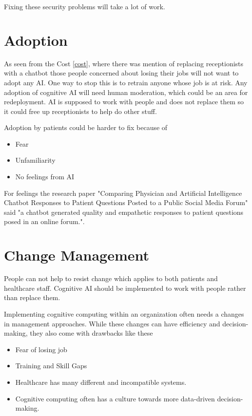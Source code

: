 \documentclass{article}
\begin{document}
Fixing these security problems will take a lot of work.

\section{Adoption}
As seen from the Cost \ref{cost}, where there was mention of replacing receptionists with a chatbot those people concerned about losing their jobs will not want to adopt any AI. One way to stop this is to retrain anyone whose job is at risk. Any adoption of cognitive AI will need human moderation, which could be an area for redeployment. 
AI is supposed to work with people and does not replace them so it could free up receptionists to help do other stuff.

Adoption by patients could be harder to fix because of
\begin{itemize}
	\item Fear
	\item Unfamiliarity
	\item No feelings from AI
\end{itemize}
For feelings the research paper "Comparing Physician and Artificial Intelligence Chatbot Responses to Patient Questions Posted to a Public Social Media Forum" \cite{bedside} said "a chatbot generated quality and empathetic responses to patient questions posed in an online forum.".

\section{Change Management}
People can not help to resist change which applies to both patients and healthcare staff. Cognitive AI should be implemented to work with people rather than replace them.

Implementing cognitive computing within an organization often needs a changes in management approaches. While these changes can have efficiency and decision-making, they also come with drawbacks like these

\begin{itemize}
\item Fear of losing job
\item Training and Skill Gaps
\item Healthcare has many different and incompatible systems.
\item Cognitive computing often has a culture towards more data-driven decision-making.
\end{itemize}
\end{document}
